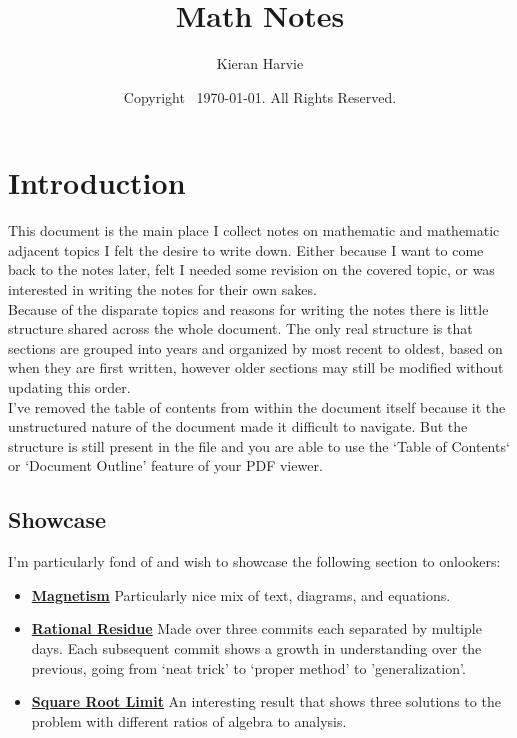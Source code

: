 \documentclass[12pt]{report}
\title{Math Notes}
\date{Copyright \textcopyright\, \today. All Rights Reserved.}
\author{Kieran Harvie}
\begin{document}
\maketitle

\section{Introduction}
This document is the main place I collect notes on mathematic and mathematic adjacent topics I felt the desire to write down.
Either because I want to come back to the notes later,
felt I needed some revision on the covered topic,
or was interested in writing the notes for their own sakes.
\\

Because of the disparate topics and reasons for writing the notes there is little structure shared across the whole document.
The only real structure is that sections are grouped into years and organized by most recent to oldest,
based on when they are first written,
however older sections may still be modified without updating this order.
\\

I've removed the table of contents from within the document itself because it the unstructured nature of the document made it difficult to navigate.
But the structure is still present in the file and you are able to use the `Table of Contents` or `Document Outline' feature of your PDF viewer. 

\subsection{Showcase}
I'm particularly fond of and wish to showcase the following section to onlookers:
\begin{itemize}
	\item \hyperref[showcase:magnetism]{\bf Magnetism} 
		Particularly nice mix of text, diagrams, and equations.
	\item \hyperref[showcase:rational_residue]{\bf Rational Residue} 
		Made over three commits each separated by multiple days. 
		Each subsequent commit shows a growth in understanding over the previous,
		going from `neat trick' to `proper method' to 'generalization'.
	\item \hyperref[showcase:sqrt_limit]{\bf Square Root Limit} 
		An interesting result that shows three solutions to the problem with different ratios of algebra to analysis.
\end{itemize}
\end{document}
